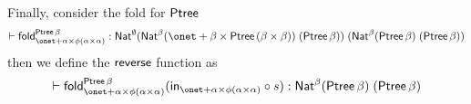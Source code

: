 \documentclass[acmsmall,review,anonymous]{acmart}
\theoremstyle{definition}
\begin{document}
Finally, consider the fold for $\mathsf{Ptree}$
\[
	\vdash \fold_{\onet + \alpha \times \phi(\alpha \times \alpha)}^{\Ptree\,\beta}
	: \Nat^{\emptyset}
	(\Nat^{\beta} (\onet + \beta \times \Ptree\,(\beta \times \beta)) \; (\Ptree\,\beta))\;
	(\Nat^{\beta} (\Ptree\,\beta) \; (\Ptree\,\beta))
\]
then we define the $\mathsf{reverse}$ function as
\[
	\vdash \fold_{\onet + \alpha \times \phi(\alpha \times \alpha)}^{\Ptree\, \beta} (\tin_{\onet + \alpha \times \phi(\alpha \times \alpha)} \circ s)
	: \Nat^{\beta} (\Ptree\,\beta) \; (\Ptree\,\beta)
\]
\end{document}
